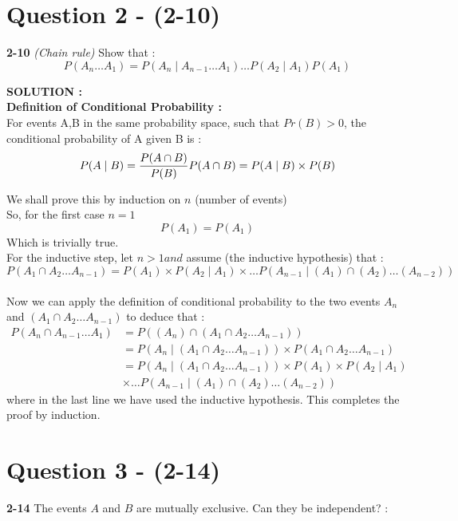 \documentclass{article}
\begin{document}
\section{Question 2 - (2-10)}
\label{Q2}
\textbf{2-10} \textit{(Chain rule)} Show that  : \\
\begin{equation*}
	P(A_n \dots A_1) = P(A_n \mid A_{n-1} \dots A_1) \dots P(A_2 \mid A_1)P(A_1)
\end{equation*}

\hspace{1em} \large{\textbf{SOLUTION :}} \\
\textbf{Definition of Conditional Probability :}\\
For events A,B in the same probability space, such that $Pr(B) > 0$, the conditional probability of A given B is : \\
$$P(A \mid B) = \frac{P(A \cap B)}{P(B)} \\
P(A \cap B) = P(A \mid B) \times P(B) $$

 
We shall prove this by induction on $n$ (number of events)\\
So, for the first case $ n = 1 $ \\
$$P(A_1) = P(A_1)$$
Which is trivially true. \\
For the inductive step, let $n > 1 and$ assume (the inductive hypothesis) that : \\
$$P(A_1 \cap A_2 \dots A_{n-1}) = P(A_1) \times P(A_2 \mid A_1) \times \dots P(A_{n-1} \mid (A_1) \cap (A_2) \dots (A_{n-2})) $$ \\
Now we can apply the definition of conditional probability to the two events $A_n$ and $(A_1 \cap A_2 \dots A_{n-1})$ to deduce that : \\
\begin{align*}
	P(A_n \cap A_{n-1} \dots A_1) &= P((A_n) \cap (A_1 \cap A_2 \dots A_{n-1})) \\
	&= P(A_n \mid (A_1 \cap A_2 \dots A_{n-1})) \times P(A_1 \cap A_2 \dots A_{n-1}) \\
	&= P(A_n \mid (A_1 \cap A_2 \dots A_{n-1})) \times P(A_1) \times P(A_2 \mid A_1) \\ &\times \dots P(A_{n-1} \mid (A_1) \cap (A_2) \dots (A_{n-2})) 
\end{align*}
where in the last line we have used the inductive hypothesis. This completes the proof by induction.

\section{Question 3 - (2-14)}
\label{Q3}
\textbf{2-14}  The events $A$ and $B$ are mutually exclusive. Can they be independent?  : \\
\end{document}
